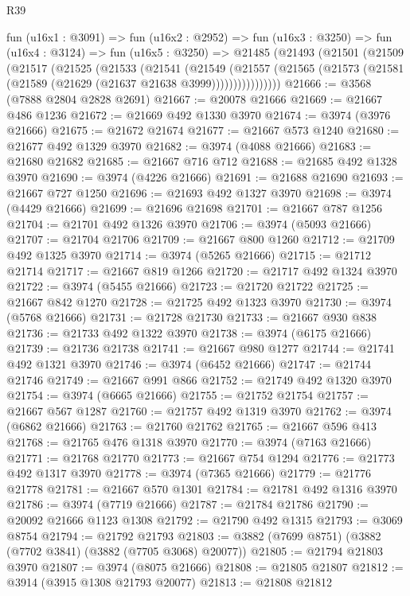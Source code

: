 \begin{lexlean}{R39}
\begin{coremodule}
    fun (u16x1 : @3091) =>
    fun (u16x2 : @2952) =>
    fun (u16x3 : @3250) =>
    fun (u16x4 : @3124) =>
    fun (u16x5 : @3250) =>
    @21485
      (@21493
        (@21501
          (@21509
            (@21517
              (@21525
                (@21533
                  (@21541
                    (@21549
                      (@21557
                        (@21565 (@21573 (@21581 (@21589 (@21629 (@21637 @21638 @3999))))))))))))))))
@21666 := @3568 (@7888 @2804 @2828 @2691)
@21667 := @20078 @21666
@21669 := @21667 @486 @1236
@21672 := @21669 @492 @1330 @3970
@21674 := @3974 (@3976 @21666)
@21675 := @21672 @21674
@21677 := @21667 @573 @1240
@21680 := @21677 @492 @1329 @3970
@21682 := @3974 (@4088 @21666)
@21683 := @21680 @21682
@21685 := @21667 @716 @712
@21688 := @21685 @492 @1328 @3970
@21690 := @3974 (@4226 @21666)
@21691 := @21688 @21690
@21693 := @21667 @727 @1250
@21696 := @21693 @492 @1327 @3970
@21698 := @3974 (@4429 @21666)
@21699 := @21696 @21698
@21701 := @21667 @787 @1256
@21704 := @21701 @492 @1326 @3970
@21706 := @3974 (@5093 @21666)
@21707 := @21704 @21706
@21709 := @21667 @800 @1260
@21712 := @21709 @492 @1325 @3970
@21714 := @3974 (@5265 @21666)
@21715 := @21712 @21714
@21717 := @21667 @819 @1266
@21720 := @21717 @492 @1324 @3970
@21722 := @3974 (@5455 @21666)
@21723 := @21720 @21722
@21725 := @21667 @842 @1270
@21728 := @21725 @492 @1323 @3970
@21730 := @3974 (@5768 @21666)
@21731 := @21728 @21730
@21733 := @21667 @930 @838
@21736 := @21733 @492 @1322 @3970
@21738 := @3974 (@6175 @21666)
@21739 := @21736 @21738
@21741 := @21667 @980 @1277
@21744 := @21741 @492 @1321 @3970
@21746 := @3974 (@6452 @21666)
@21747 := @21744 @21746
@21749 := @21667 @991 @866
@21752 := @21749 @492 @1320 @3970
@21754 := @3974 (@6665 @21666)
@21755 := @21752 @21754
@21757 := @21667 @567 @1287
@21760 := @21757 @492 @1319 @3970
@21762 := @3974 (@6862 @21666)
@21763 := @21760 @21762
@21765 := @21667 @596 @413
@21768 := @21765 @476 @1318 @3970
@21770 := @3974 (@7163 @21666)
@21771 := @21768 @21770
@21773 := @21667 @754 @1294
@21776 := @21773 @492 @1317 @3970
@21778 := @3974 (@7365 @21666)
@21779 := @21776 @21778
@21781 := @21667 @570 @1301
@21784 := @21781 @492 @1316 @3970
@21786 := @3974 (@7719 @21666)
@21787 := @21784 @21786
@21790 := @20092 @21666 @1123 @1308
@21792 := @21790 @492 @1315
@21793 := @3069 @8754
@21794 := @21792 @21793
@21803 := @3882 (@7699 @8751) (@3882 (@7702 @3841) (@3882 (@7705 @3068) @20077))
@21805 := @21794 @21803 @3970
@21807 := @3974 (@8075 @21666)
@21808 := @21805 @21807
@21812 := @3914 (@3915 @1308 @21793 @20077)
@21813 := @21808 @21812

\end{coremodule}
\end{lexlean}
